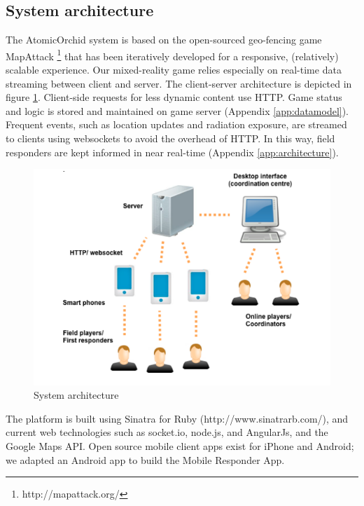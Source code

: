 \subsection{System architecture}
The AtomicOrchid system is based on the open-sourced geo-fencing game MapAttack \footnote{http://mapattack.org/} that has been iteratively developed for a responsive, (relatively) scalable experience. Our mixed-reality game relies especially on real-time data streaming between client and server. The client-server architecture is depicted in figure \ref{fig:sysArchitecture}. Client-side requests for less dynamic content use HTTP. Game status and logic is stored and maintained on game server (Appendix \ref{app:datamodel}). Frequent events, such as location updates and radiation exposure, are streamed to clients using websockets to avoid the overhead of HTTP. In this way, field responders are kept informed in near real-time (Appendix \ref{app:architecture}).  \\

\begin{figure}[h]
  \centering
  \includegraphics[width=1\textwidth]{img/approach/systemArchitecture}
  \caption{System architecture}
  \label{fig:sysArchitecture}
\end{figure}

The platform is built using Sinatra for Ruby (http://www.sinatrarb.com/), and current web technologies such as socket.io, node.js, and AngularJs, and the Google Maps API. Open source mobile client apps exist for iPhone and Android; we adapted an Android app to build the Mobile Responder App.\\


